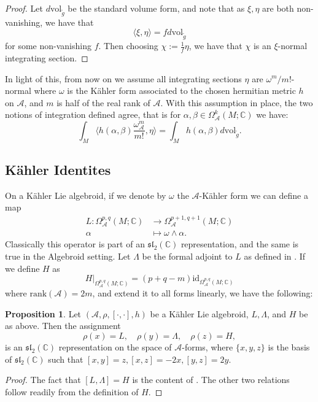 \documentclass{amsart}
\newcommand{\C}{\mathbb{C}}
\newcommand{\ra}{\rightarrow}
\newcommand{\id}{\text{id}}
\theoremstyle{definition}
\newtheorem{prop}[theorem]{Proposition}
\newcommand{\A}{\mathcal{A}}
\theoremstyle{definition}
\begin{document}
\begin{proof}
Let $d\mathrm{vol}_{\tilde{g}}$ be the standard volume form, and note that as $\xi,\eta$ are both non-vanishing, we have that 
\begin{equation*}
    \langle \xi ,\eta \rangle = f d\mathrm{vol}_{\tilde{g}}
\end{equation*}
for some non-vanishing $f$. Then choosing $\chi:= \frac{1}{f}\eta$, we have that $\chi$ is an $\xi$-normal integrating section.
\end{proof}
In light of this, from now on we assume all integrating sections $\eta$ are $\omega^m/m!$-normal where $\omega$ is the Kähler form associated to the chosen hermitian metric $h$ on $\A$, and $m$ is half of the real rank of $\A$. With this assumption in place, the two notions of integration defined agree, that is for $\alpha ,\beta \in \Omega_\A^k(M;\C)$ we have:
\begin{equation*}
    \int_M\langle h(\alpha,\beta) \frac{\omega_\A^m}{m!}, \eta \rangle = \int_M h(\alpha,\beta) d\mathrm{vol}_{\tilde{g}}.
\end{equation*}
\subsection{Kähler Identites}
 On a Kähler Lie algebroid, if we denote by $\omega$ the $\A$-Kähler form we can define a map
\begin{align*}
    L :\Omega^{p,q}_\A(M;\C) &\ra \Omega^{p+1,q+1}_\A(M;\C) \\
    \alpha &\mapsto \omega \wedge \alpha.
\end{align*}
Classically this operator is part of an $\mathfrak{sl}_2(\C)$ representation, and the same is true in the Algebroid setting. Let $\Lambda$ be the formal adjoint to $L$ as defined in \cite{MR4722602}. If we define $H$ as
\begin{equation*}
    H|_{\Omega^{p,q}_\A(M;\C)}=(p+q-m)\id_{\Omega^{p,q}_\A(M;\C)} 
\end{equation*}
where $\mathrm{rank}(\A)=2m$, and extend it to all forms linearly, we have the following:
\begin{prop}
    Let $(\A, \rho , [\cdot, \cdot],h)$ be a Kähler Lie algebroid, $L, \Lambda$, and $H$ be as above. Then the assignment
    \begin{equation*}
        \rho(x) = L, \quad \rho(y)=\Lambda, \quad \rho(z)=H,
    \end{equation*}
    is an $\mathfrak{sl}_2(\C)$ representation on the space of $\A$-forms, where $\{x,y,z\}$ is the basis of $\mathfrak{sl}_2(\C)$ such that $[x,y]=z, [x,z]=-2x, [y,z]=2y$.
\end{prop}
\begin{proof}
    The fact that $[L,\Lambda]=H$ is the content of \cite[Lemma 5]{MR4722602}. The other two relations follow readily from the definition of $H$.
\end{proof}
\end{document}
